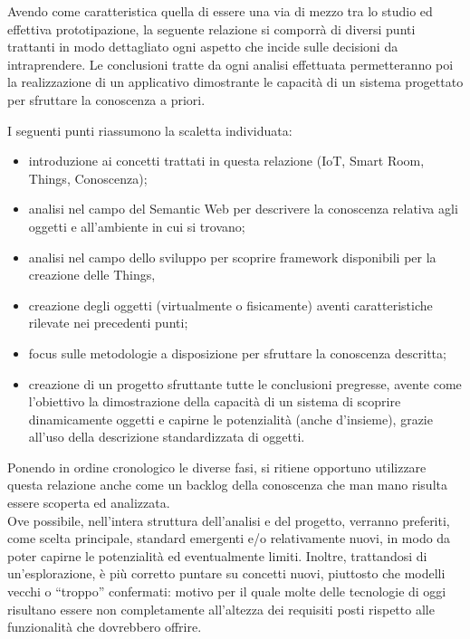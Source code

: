 \documentclass[12pt,a4paper,openright,oneside]{report}
\newcommand{\quotes}[1]{``#1''}
\begin{document}
Avendo come caratteristica quella di essere una via di mezzo tra lo studio ed effettiva prototipazione, la seguente relazione si comporrà di diversi punti trattanti in modo dettagliato ogni aspetto che incide sulle decisioni da intraprendere. Le conclusioni tratte da ogni analisi effettuata permetteranno poi la realizzazione di un applicativo dimostrante le capacità di un sistema progettato per sfruttare la conoscenza a priori. 

I seguenti punti riassumono la scaletta individuata:

\begin{itemize}
	\item introduzione ai concetti trattati in questa relazione (IoT, Smart Room, Things, Conoscenza);
	
	\item analisi nel campo del Semantic Web per descrivere la conoscenza relativa agli oggetti e all'ambiente in cui si trovano;
	
	\item analisi nel campo dello sviluppo per scoprire framework disponibili per la creazione delle Things,
	
	\item creazione degli oggetti (virtualmente o fisicamente) aventi caratteristiche rilevate nei precedenti punti;
	
	\item focus sulle metodologie a disposizione per sfruttare la conoscenza descritta;
	
	\item creazione di un progetto sfruttante tutte le conclusioni pregresse, avente come l'obiettivo la dimostrazione della capacità di un sistema di scoprire dinamicamente oggetti e capirne le potenzialità (anche d'insieme), grazie all'uso della descrizione standardizzata di oggetti.
	
\end{itemize}

Ponendo in ordine cronologico le diverse fasi, si ritiene opportuno utilizzare questa relazione anche come un backlog della conoscenza che man mano risulta essere scoperta ed analizzata.\\

\label{new_tecnologies}
Ove possibile, nell'intera struttura dell'analisi e del progetto, verranno preferiti, come scelta principale, standard emergenti e/o relativamente nuovi, in modo da poter capirne le potenzialità ed eventualmente limiti. Inoltre, trattandosi di un'esplorazione, è più corretto puntare su concetti nuovi, piuttosto che modelli vecchi o \quotes{troppo} confermati: motivo per il quale molte delle tecnologie di oggi risultano essere non completamente all'altezza dei requisiti posti rispetto alle funzionalità che dovrebbero offrire.
\end{document}
